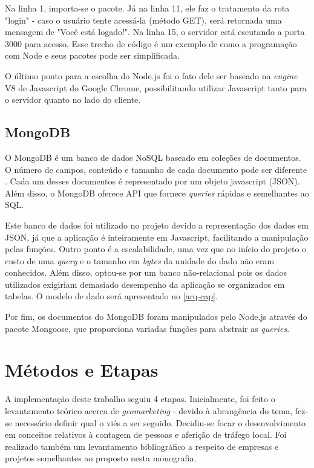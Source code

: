 Na linha 1, importa-se o pacote. Já na linha 11, ele faz o tratamento da rota "login" - caso o usuário tente acessá-la (método GET), será retornada uma mensagem de "Você está logado!". Na linha 15, o servidor está escutando a porta 3000 para acesso. Esse trecho de código é um exemplo de como a programação
com Node e seus pacotes pode ser simplificada.

O último ponto para a escolha do Node.js foi o fato dele ser baseado na
\emph{engine} V8 de Javascript do Google Chrome, possibilitando utilizar
Javascript tanto para o servidor quanto no lado do cliente.

\subsection{MongoDB}
O MongoDB é um banco de dados NoSQL baseado em coleções de documentos. O número
de campos, conteúdo e tamanho de cada documento pode ser diferente \cite{mongo}.
Cada um desses documentos é representado por um objeto javascript (JSON). Além
disso, o MongoDB oferece API que fornece \emph{queries} rápidas e semelhantes ao
SQL.

Este banco de dados foi utilizado no projeto devido a representação dos dados em
JSON, já que a aplicação é inteiramente em Javascript, facilitando a
manipulação pelas funções. Outro ponto é a escalabilidade, uma vez que no início
do projeto o custo de uma \emph{query} e o tamanho em \emph{bytes} da unidade do
dado não eram conhecidos. Além disso, optou-se por um banco não-relacional pois os dados utilizados exigiriam demasiado desempenho da aplicação se organizados em tabelas. O modelo de dado será apresentado no \autoref{arq-cap}.

Por fim, os documentos do MongoDB foram manipulados pelo Node.js através do pacote Mongoose, que proporciona variadas
funções para abstrair as \emph{queries}.

\section{Métodos e Etapas}
\label{metodos-etapas}

A implementação deste trabalho seguiu 4 etapas. Inicialmente, foi feito o levantamento teórico acerca de \emph{geomarketing} - devido à abrangência do tema, fez-se necessário definir
qual o viés a ser seguido. Decidiu-se focar o desenvolvimento em conceitos
relativos à contagem de pessoas e aferição de tráfego local. Foi realizado
também um levantamento bibliográfico a respeito de empresas e projetos
semelhantes ao proposto nesta monografia.

